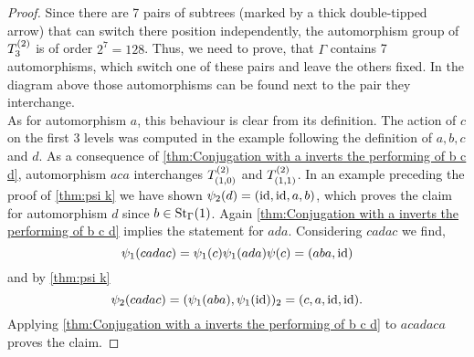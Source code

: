 \begin{proof}
Since there are 7 pairs of subtrees (marked by a thick double-tipped arrow) that can switch there position independently, the automorphism group of $\T_3$ is of order $2^7=128$. Thus, we need to prove, that $\Gamma$ contains 7 automorphisms, which switch one of these pairs and leave the others fixed. In the diagram above those automorphisms can be found next to the pair they interchange.\\
As for automorphism $a$, this behaviour is clear from its definition. The action of $c$ on the first 3 levels was computed in the example following the definition of $a,b,c$ and $d$. As a consequence of \cref{thm:Conjugation with a inverts the performing of b c d}, automorphism $aca$ interchanges $\ST{(1,0)}$ and $\ST{(1,1)}$. In an example preceding the proof of \cref{thm:psi k} we have shown $\psi_2(d)=(\id,\id,a,b)$, which proves the claim for automorphism $d$ since $b\in\St[\Gamma]{1}$. Again \cref{thm:Conjugation with a inverts the performing of b c d} implies the statement for $ada$. Considering $cadac$ we find,
\begin{equation*}
\psi_1(cadac)=\psi_1(c)\psi_1(ada)\psi(c)=(aba,\id)
\end{equation*}
and by \cref{thm:psi k}
\begin{equation*}
\psi_2(cadac)=(\psi_1(aba),\psi_1(\id))_2=(c,a,\id,\id).
\end{equation*}
Applying \cref{thm:Conjugation with a inverts the performing of b c d} to $acadaca$ proves the claim.
\end{proof}
